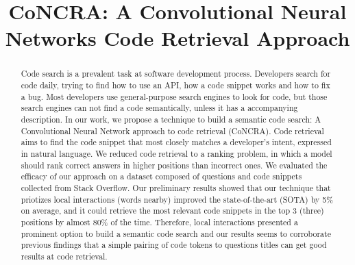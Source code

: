\documentclass[sigconf]{acmart}
\begin{document}
\title{CoNCRA: A Convolutional Neural Networks Code Retrieval Approach}






\begin{abstract}
    Code search is a prevalent task at software development process. Developers search for code daily, trying to find how to use an API, how a code snippet works and how to fix a bug. Most developers use general-purpose search engines to look for code, but those search engines can not find a code semantically, unless it has a accompanying description. In our work, we propose a technique to build a semantic code search: A Convolutional Neural Network approach to code retrieval (CoNCRA). Code retrieval aims to find the code snippet that most closely matches a developer's intent, expressed in natural language. We reduced code retrieval to a ranking problem, in which a model should rank correct answers in higher positions than incorrect ones. We evaluated the efficacy of our approach on a dataset composed of questions and code snippets collected from Stack Overflow. Our preliminary results showed that our technique that priotizes local interactions (words nearby) improved the state-of-the-art (SOTA) by 5\% on average, and it could retrieve the most relevant code snippets in the top 3 (three) positions by almost 80\% of the time. Therefore, local interactions presented a prominent option to build a semantic code search and our results seems to corroborate previous findings that a simple pairing of code tokens to questions titles can get good results at code retrieval.
\end{abstract}
\end{document}
